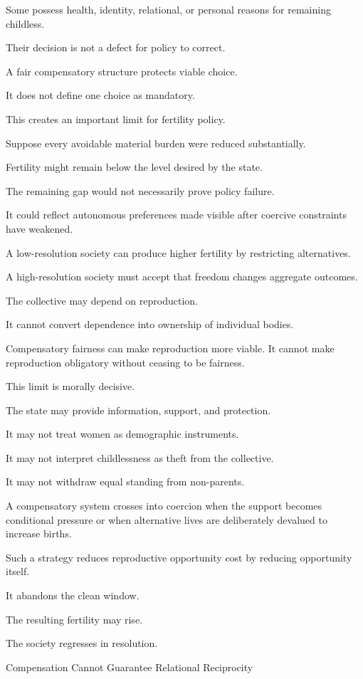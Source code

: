 Some possess health, identity, relational, or personal reasons for remaining childless.

Their decision is not a defect for policy to correct.

A fair compensatory structure protects viable choice.

It does not define one choice as mandatory.

This creates an important limit for fertility policy.

Suppose every avoidable material burden were reduced substantially.

Fertility might remain below the level desired by the state.

The remaining gap would not necessarily prove policy failure.

It could reflect autonomous preferences made visible after coercive constraints have weakened.

A low-resolution society can produce higher fertility by restricting alternatives.

A high-resolution society must accept that freedom changes aggregate outcomes.

The collective may depend on reproduction.

It cannot convert dependence into ownership of individual bodies.

Compensatory fairness can make reproduction more viable. It cannot make reproduction obligatory without ceasing to be fairness.

This limit is morally decisive.

The state may provide information, support, and protection.

It may not treat women as demographic instruments.

It may not interpret childlessness as theft from the collective.

It may not withdraw equal standing from non-parents.

A compensatory system crosses into coercion when the support becomes conditional pressure or when alternative lives are deliberately devalued to increase births.

Such a strategy reduces reproductive opportunity cost by reducing opportunity itself.

It abandons the clean window.

The resulting fertility may rise.

The society regresses in resolution.

Compensation Cannot Guarantee Relational Reciprocity

